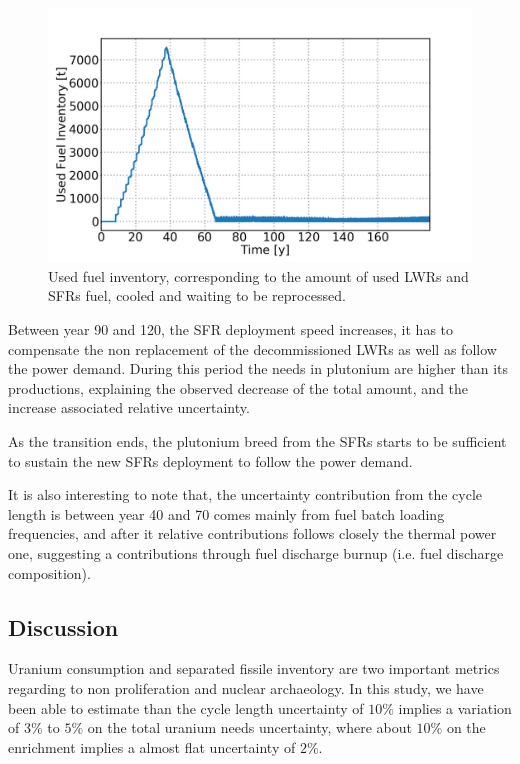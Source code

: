 \documentclass{anstrans}
\begin{document}
\begin{figure}[ht] %
    \centering
    \includegraphics[scale=0.18]{used_fuel}
    \caption{Used fuel inventory, corresponding to the amount of used
    \glspl{LWR} and \glspl{SFR} fuel, cooled and waiting to be reprocessed.}
    \label{fig:used_fuel}
\end{figure}
Between year 90 and 120, the \gls{SFR} deployment speed increases, it has to
compensate the non replacement of the decommissioned \glspl{LWR} as well as
follow the power demand.  During this period the needs in plutonium are higher
than its productions, explaining the observed decrease of the total amount, and
the increase associated relative uncertainty.

As the transition ends, the plutonium breed from the \glspl{SFR} starts to be
sufficient to sustain the new \glspl{SFR} deployment to follow the power demand.

It is also interesting to note that, the uncertainty contribution from the cycle
length is between year 40 and 70 comes mainly from fuel batch loading
frequencies, and after it relative contributions follows closely the thermal
power one, suggesting a contributions through fuel discharge burnup (i.e.  fuel
discharge composition).

\subsection{Discussion}

Uranium consumption and separated fissile inventory are two important metrics
regarding to non proliferation and nuclear archaeology.  In this study, we have
been able to estimate than the cycle length uncertainty of $10\%$ implies a
variation of $3\%$ to $5\%$ on the total uranium needs uncertainty, where about
$10\%$ on the enrichment implies a almost flat uncertainty of $2\%$.
\end{document}
